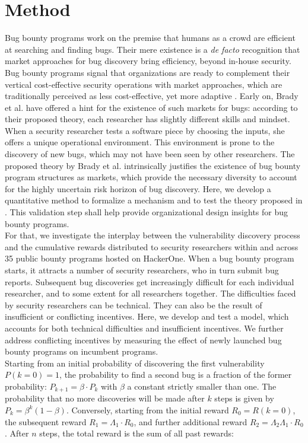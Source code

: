 \section{Method}
\label{sec:method}
Bug bounty programs work on the premise that humans as a crowd are efficient at searching and finding bugs. Their mere existence is a {\it de facto} recognition that market approaches for bug discovery bring efficiency, beyond in-house security. Bug bounty programs signal that organizations are ready to complement their vertical cost-effective security operations with market approaches, which are traditionally perceived as less cost-effective, yet more adaptive \cite{coase1937}. Early on, Brady et al. \cite{brady1999murphy} have offered a hint for the existence of such markets for bugs: according to their proposed theory, each researcher has slightly different skills and mindset. When a security researcher tests a software piece by choosing the inputs, she offers a unique operational environment. This environment is prone to the discovery of new bugs, which may not have been seen by other researchers. The proposed theory by Brady et al. \cite{brady1999murphy} intrinsically justifies the existence of bug bounty program structures as markets, which provide the necessary diversity to account for the highly uncertain risk horizon of bug discovery. Here, we develop a quantitative method to formalize a mechanism and to test the theory proposed in \cite{brady1999murphy}. This validation step shall help provide organizational design insights for bug bounty programs.\\

For that, we investigate the interplay between the vulnerability discovery process and the cumulative rewards distributed to security researchers within and across 35 public bounty programs hosted on HackerOne. When a bug bounty program starts, it attracts a number of security researchers, who in turn submit bug reports. Subsequent bug discoveries get increasingly difficult for each individual researcher, and to some extent for all researchers together. The difficulties faced by security researchers can be technical. They can also be the result of insufficient or conflicting incentives. Here, we develop and test a model, which accounts for both technical difficulties and insufficient incentives. We further address conflicting incentives by measuring the effect of newly launched bug bounty programs on incumbent programs.\\

Starting from an initial probability of discovering the first vulnerability $P(k=0) = 1$, the probability to find a second bug is a fraction of the former probability: $P_{k+1} = \beta \cdot P_k$ with $\beta$ a constant strictly smaller than one. The probability that no more discoveries will be made after $k$ steps is given by $P_k = \beta^{k} (1-\beta)$. Conversely, starting from the initial reward $R_0 = R(k=0)$, the subsequent reward $R_1 = \Lambda_1 \cdot R_0$, and further additional reward $ R_2 = \Lambda_2 \Lambda_1 \cdot R_{0}$. After $n$ steps, the total reward is the sum of all past rewards: 

